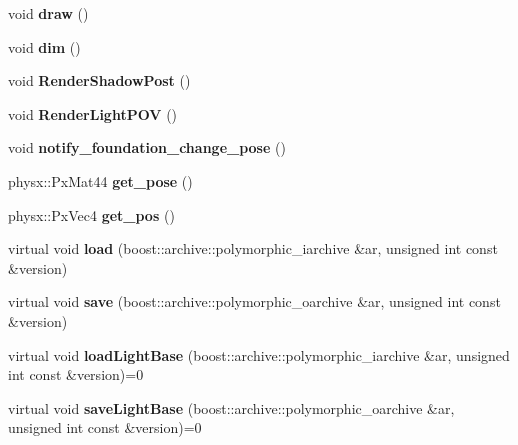 \begin{DoxyCompactItemize}
\item 
\hypertarget{classNeb_1_1Light_1_1Base_af8a85af5b35db73ee6e260eb5d16ec0b}{void {\bfseries draw} ()}\label{classNeb_1_1Light_1_1Base_af8a85af5b35db73ee6e260eb5d16ec0b}

\item 
\hypertarget{classNeb_1_1Light_1_1Base_a0f2d5367bfdcb1911153bd4a21c26e50}{void {\bfseries dim} ()}\label{classNeb_1_1Light_1_1Base_a0f2d5367bfdcb1911153bd4a21c26e50}

\item 
\hypertarget{classNeb_1_1Light_1_1Base_a132bb5f66b3b590aa55f53ee17a67c4a}{void {\bfseries Render\-Shadow\-Post} ()}\label{classNeb_1_1Light_1_1Base_a132bb5f66b3b590aa55f53ee17a67c4a}

\item 
\hypertarget{classNeb_1_1Light_1_1Base_aac6c4177c6fd3b4f8773b0d431203ccc}{void {\bfseries Render\-Light\-P\-O\-V} ()}\label{classNeb_1_1Light_1_1Base_aac6c4177c6fd3b4f8773b0d431203ccc}

\item 
\hypertarget{classNeb_1_1Light_1_1Base_a45e032e7aa7203c0832d52949e14141c}{void {\bfseries notify\-\_\-foundation\-\_\-change\-\_\-pose} ()}\label{classNeb_1_1Light_1_1Base_a45e032e7aa7203c0832d52949e14141c}

\item 
\hypertarget{classNeb_1_1Light_1_1Base_a78c4664de9ddf719dea72d00fa8498a4}{physx\-::\-Px\-Mat44 {\bfseries get\-\_\-pose} ()}\label{classNeb_1_1Light_1_1Base_a78c4664de9ddf719dea72d00fa8498a4}

\item 
\hypertarget{classNeb_1_1Light_1_1Base_a125c8d3d4795bcec4ec546d82686bf38}{physx\-::\-Px\-Vec4 {\bfseries get\-\_\-pos} ()}\label{classNeb_1_1Light_1_1Base_a125c8d3d4795bcec4ec546d82686bf38}

\item 
\hypertarget{classNeb_1_1Light_1_1Base_ac8b71e530696633d24137c4d5d695af5}{virtual void {\bfseries load} (boost\-::archive\-::polymorphic\-\_\-iarchive \&ar, unsigned int const \&version)}\label{classNeb_1_1Light_1_1Base_ac8b71e530696633d24137c4d5d695af5}

\item 
\hypertarget{classNeb_1_1Light_1_1Base_a4e83a340a8c97d92da3bf3165bc4b176}{virtual void {\bfseries save} (boost\-::archive\-::polymorphic\-\_\-oarchive \&ar, unsigned int const \&version)}\label{classNeb_1_1Light_1_1Base_a4e83a340a8c97d92da3bf3165bc4b176}

\item 
\hypertarget{classNeb_1_1Light_1_1Base_a54780bbb4d3ce64a6151c20b1f72f6ef}{virtual void {\bfseries load\-Light\-Base} (boost\-::archive\-::polymorphic\-\_\-iarchive \&ar, unsigned int const \&version)=0}\label{classNeb_1_1Light_1_1Base_a54780bbb4d3ce64a6151c20b1f72f6ef}

\item 
\hypertarget{classNeb_1_1Light_1_1Base_a83fd19d93bf401dd11f9fd30eb9ba7dc}{virtual void {\bfseries save\-Light\-Base} (boost\-::archive\-::polymorphic\-\_\-oarchive \&ar, unsigned int const \&version)=0}\label{classNeb_1_1Light_1_1Base_a83fd19d93bf401dd11f9fd30eb9ba7dc}

\end{DoxyCompactItemize}
